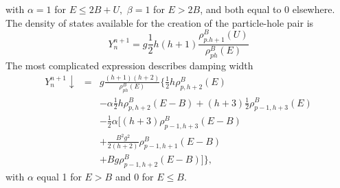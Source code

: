 \documentclass[twocolumn,amsmath,amssymb,10pt,groupedaddress,a4paper]{revtex4}
\begin{document}
with $\alpha=1$ for $E\leq2B+U,\,\,\beta=1$ for $E>2B$, and both
equal to 0 elsewhere. The density of states available for the creation
of the particle-hole pair is
\begin{equation}
Y_{n}^{n+1}=g\frac{1}{2}h(h+1)\frac{\rho_{p.h+1}^{B}(U)}{\rho_{ph}^{B}(E)}
\label{Yplus}
\end{equation}
The most complicated expression describes damping width
\begin{eqnarray}
Y_{n}^{n+1}\downarrow & = & g\frac{(h+1)(h+2)}{\rho_{ph}^{B}(E)}\biggl\{\frac{1}{2}h\rho_{p,h+2}^{B}(E)\nonumber\\
&&-\alpha\frac{1}{2}h\rho_{p,h+2}^{B}(E-B)+(h+3)\frac{1}{2}\rho_{p-1,h+3}^{B}(E)\nonumber \\
 &  & -\frac{1}{2}\alpha\biggl[(h+3)\rho_{p-1,h+3}^{B}(E-B)\label{Ydown}\nonumber\\
 &  & +\frac{B^{2}g^{2}}{2(h+2)}\rho_{p-1,h+1}^{B}(E-B)\nonumber \\
&& +Bg\rho_{p-1,h+2}^{B}(E-B)\biggr]\biggr\},
\end{eqnarray}
\noindent with $\alpha$ equal 1 for $E>B$ and 0 for $E\leq B$.
\end{document}

